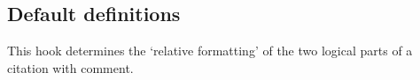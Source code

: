 \begin{macro}{\nocite}
\begin{teX}
  \else
       \end{teX}
       \begin{teX}
    \@latex@error{Cannot be used in preamble}\@eha
       \end{teX}
       \begin{teX}
  \fi
  \@esphack}
       \end{teX}
       \begin{teX}
\expandafter\let\csname b@*\endcsname\@empty
       \end{teX}
  \end{macro}
%
%
 \subsection{Default definitions}

    This hook determines the `relative formatting' of the two logical
    parts of a citation with comment.
    
 \begin{macro}{\@cite}
       \begin{teX}
\def\@cite#1#2{[{#1\if@tempswa , #2\fi}]}
       \end{teX}
  \end{macro}
%
 \begin{macro}{\@cite@ofmt}
       \begin{teX}
\let\@cite@ofmt\hbox
       \end{teX}
  \end{macro}

 \begin{macro}{\@biblabel}
       \begin{teX}
\def\@biblabel#1{[#1]}
       \end{teX}
  \end{macro}
